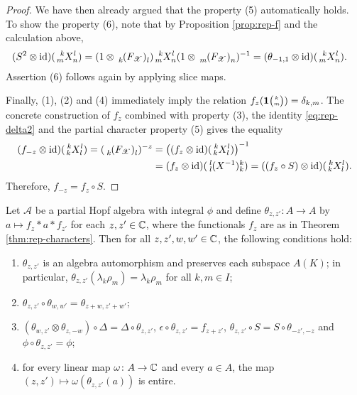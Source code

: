 \begin{proof}
We have then already argued that the property (5) automatically holds. To show the property (6), note that by Proposition \ref{prop:rep-f} and the calculation above,
    \begin{align*}
      (S^{2} \otimes \id)(\Gr{X}{k}{l}{m}{n}) &= (1
      \otimes\Grd{(F_{\mathscr{X}})}{k}{l})
      \Gr{X}{k}{l}{m}{n}(1 \otimes \Grd{(F_{\mathscr{X}})}{m}{n})^{-1} 
      =(\theta_{-1,1}  \otimes \id)(\Gr{X}{k}{l}{m}{n}).
    \end{align*}
     Assertion (6) follows again by applying slice maps.
    
     Finally, (1), (2) and (4)
     immediately imply the relation
     $f_{z}(\mathbf{1}{\tiny {\begin{pmatrix} k\\m\end{pmatrix}}})=\delta_{k,m}$. The concrete construction of $f_z$ combined with property (3), the identity \eqref{eq:rep-delta2} and the partial character property (5) gives the equality
     \begin{align}
       (f_{-z} \otimes \id) (\Gr{X}{k}{l}{k}{l})=
       (\Gru{(F_{\mathscr{X}})}{k}{l})^{-z} &=\left( (f_{z} \otimes
       \id)(\Gr{X}{k}{l}{k}{l})\right)^{-1} \\ &= (f_{z} \otimes
       \id)(\Gr{(X^{-1})}{l}{k}{l}{k}) = ((f_{z} \circ S) \otimes
       \id)(\Gr{X}{k}{l}{k}{l}).
     \end{align}
Therefore, $f_{-z} = f_{z} \circ S$.
\end{proof}
\begin{Cor} \label{cor:rep-characters} Let $\mathscr{A}$ be a partial
  Hopf algebra with integral $\phi$ and define $\theta_{z,z'} \colon A
  \to A$ by $a \mapsto f_{z} \ast a \ast f_{z'}$ for each $z,z' \in
  \mathbb{C}$, where the functionals $f_{z}$ are as in Theorem
  \ref{thm:rep-characters}. Then for all $z,z',w,w'\in \mathbb{C}$, the
  following conditions hold:
  \begin{enumerate}
  \item $\theta_{z,z'}$ is an algebra automorphism and preserves
    each subspace $A(K)$; in particular,
    $\theta_{z,z'}(\lambda_{k}\rho_{m}) = \lambda_{k}\rho_{m}$ for all
    $k,m\in I$;
  \item $\theta_{z,z'}\circ \theta_{w,w'} = \theta_{z+w,z'+w'}$;
  \item $ (\theta_{w,z'} \otimes \theta_{z,-w}) \circ \Delta = \Delta
    \circ \theta_{z,z'}$, $\epsilon \circ \theta_{z,z'} = f_{z+z'}$,
    $\theta_{z,z'} \circ S = S \circ \theta_{-z',-z}$ and
    $\phi \circ \theta_{z,z'} = \phi$;
  \item for every linear map $\omega \colon A \to \mathbb{C}$ and every $a\in
    A$, the map $(z,z') \mapsto \omega(\theta_{z,z'}(a))$ is entire.
  \end{enumerate}
\end{Cor}
